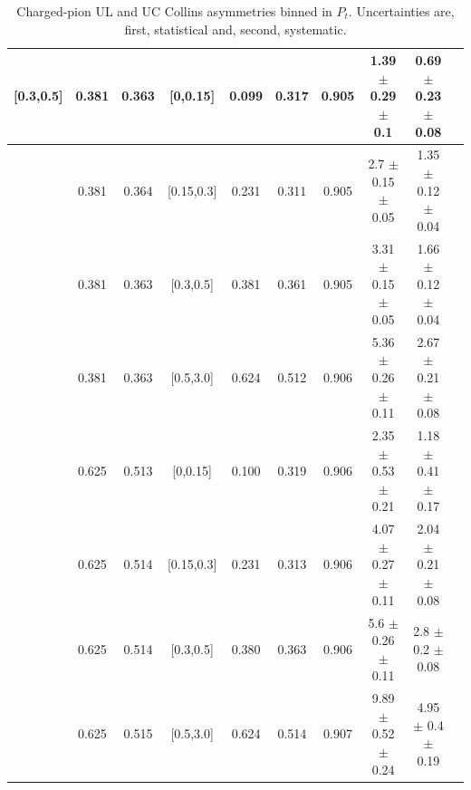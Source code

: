 \begin{table}[H]
\begin{tabular}{|c| c| c| c| c| c| c| c| c| c|}
[0.3,0.5]	&	0.381	&	0.363	&	[0,0.15]	&	0.099	&	0.317	&	0.905	&1.39  $\pm$ 0.29  $\pm$ 0.1   & 0.69  $\pm$ 0.23  $\pm$ 0.08 \\ \hline
[0.3,0.5]	&	0.381	&	0.364	&	[0.15,0.3]	&	0.231	&	0.311	&	0.905	&2.7  $\pm$ 0.15  $\pm$ 0.05   & 1.35  $\pm$ 0.12  $\pm$ 0.04 \\ \hline
[0.3,0.5]	&	0.381	&	0.363	&	[0.3,0.5]	&	0.381	&	0.361	&	0.905	&3.31  $\pm$ 0.15  $\pm$ 0.05  & 1.66  $\pm$ 0.12  $\pm$ 0.04 \\ \hline
[0.3,0.5]	&	0.381	&	0.363	&	[0.5,3.0]	&	0.624	&	0.512	&	0.906	&5.36  $\pm$ 0.26  $\pm$ 0.11  & 2.67  $\pm$ 0.21  $\pm$ 0.08 \\ \hline
\hline
[0.5,3.0]	&	0.625	&	0.513	&	[0,0.15]	&	0.100	&	0.319	&	0.906	&2.35  $\pm$ 0.53  $\pm$ 0.21  & 1.18  $\pm$ 0.41  $\pm$ 0.17 \\ \hline
[0.5,3.0]	&	0.625	&	0.514	&	[0.15,0.3]	&	0.231	&	0.313	&	0.906	&4.07  $\pm$ 0.27  $\pm$ 0.11  & 2.04  $\pm$ 0.21  $\pm$ 0.08 \\ \hline
[0.5,3.0]	&	0.625	&	0.514	&	[0.3,0.5]	&	0.380	&	0.363	&	0.906	&5.6  $\pm$ 0.26  $\pm$ 0.11   & 2.8  $\pm$ 0.2  $\pm$ 0.08   \\ \hline
[0.5,3.0]	&	0.625	&	0.515	&	[0.5,3.0]	&	0.624	&	0.514	&	0.907	&9.89  $\pm$ 0.52  $\pm$ 0.24  & 4.95  $\pm$ 0.4  $\pm$ 0.19  \\ \hline
\end{tabular}
\caption[Charged-pion UL and UC Collins asymmetries binned in $P_t$]{Charged-pion UL and UC Collins asymmetries binned in $P_t$. Uncertainties are, first, statistical and, second, systematic.}
\label{tab:finalulucptbins}
\end{table}


